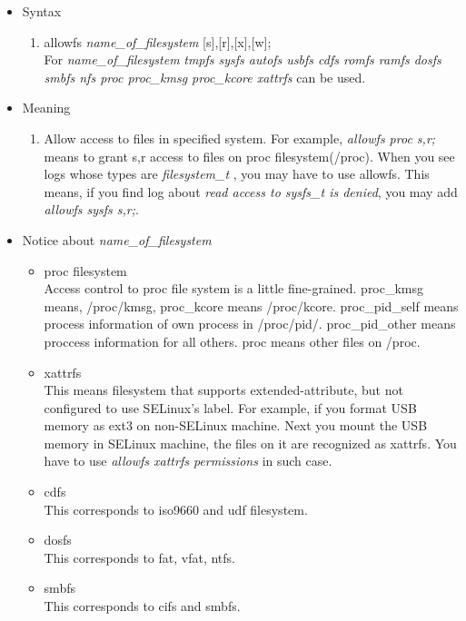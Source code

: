 \documentclass{article}
\begin{document}
\begin{itemize}
 \item Syntax
       \begin{enumerate}
	\item  allowfs {\it name\_of\_filesystem} [s],[r],[x],[w];\\
	       For {\it name\_of\_filesystem} {\it tmpfs sysfs autofs usbfs cdfs romfs
	       ramfs dosfs smbfs nfs proc proc\_kmsg proc\_kcore xattrfs} can be
	       used.
       \end{enumerate}      
 \item Meaning\\
       \begin{enumerate}

	\item Allow access to files in specified system. For example, {\it
	      allowfs proc s,r;} means to grant s,r access to files on proc
	      filesystem(/proc). When you see logs whose types are {\it
	      filesystem\_t }, you may have to use allowfs. This means, if you
	      find log about {\it read access to sysfs\_t is denied}, you may
	      add {\it allowfs sysfs s,r;}.
		
       \end{enumerate}
       

 \item Notice about {\it name\_of\_filesystem}
       \begin{itemize}
	\item proc filesystem\\
	      Access control to proc file system is a little
	      fine-grained. proc\_kmsg means, /proc/kmsg, proc\_kcore
	      means /proc/kcore. proc\_pid\_self means process information of
	      own process in /proc/pid/. proc\_pid\_other means proccess information for all
	      others. proc means other files on /proc. 
	\item xattrfs\\
	      This means filesystem that supports extended-attribute,
	      but not configured to use SELinux's label. For example, if
	      you format USB memory as ext3 on non-SELinux machine. Next
	      you mount the USB memory in SELinux machine, 
	      the files on it are recognized
	      as xattrfs. You have to use {\it allowfs xattrfs
	      permissions} in such case.
	\item cdfs\\
	      This corresponds to iso9660 and udf filesystem.
	\item dosfs\\
	      This corresponds to fat, vfat, ntfs.
	\item smbfs\\
	      This corresponds to cifs and smbfs.
       \end{itemize}
\end{itemize}
\end{document}

